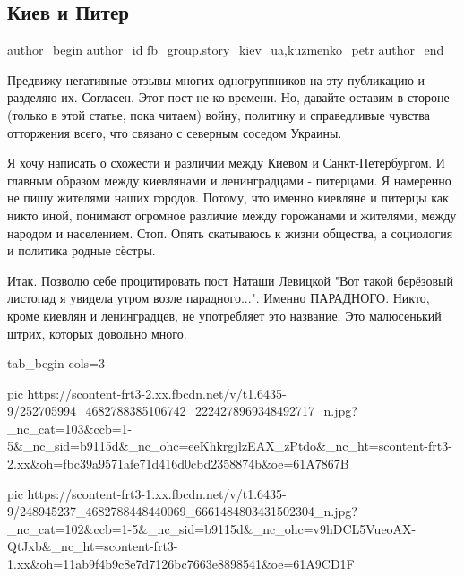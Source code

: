  
 
 
 
 
 
\subsection{Киев и Питер}
\label{sec:03_11_2021.fb.fb_group.story_kiev_ua.1.kiev_i_piter}
 
\ifcmt
 author_begin
   author_id fb_group.story_kiev_ua,kuzmenko_petr
 author_end
\fi

Предвижу негативные отзывы многих одногруппников на эту публикацию и разделяю
их. Согласен. Этот пост не ко времени. Но, давайте оставим в стороне (только в
этой статье, пока читаем) войну, политику и справедливые чувства отторжения
всего, что связано с северным соседом Украины. 

Я хочу написать о схожести и различии между Киевом и Санкт-Петербургом. И
главным образом между киевлянами и ленинградцами - питерцами. Я намеренно не
пишу жителями наших городов. Потому, что именно киевляне и питерцы как никто
иной, понимают огромное различие между горожанами и жителями, между народом и
населением. Стоп. Опять скатываюсь к жизни общества, а социология и политика
родные сёстры. 

Итак. Позволю себе
процитировать пост Наташи Левицкой "Вот такой берёзовый листопад я увидела
утром возле парадного...". Именно ПАРАДНОГО. Никто, кроме киевлян и
ленинградцев, не употребляет это название. Это малюсенький штрих, которых
довольно много. 

\ifcmt
  tab_begin cols=3

     pic https://scontent-frt3-2.xx.fbcdn.net/v/t1.6435-9/252705994_4682788385106742_2224278969348492717_n.jpg?_nc_cat=103&ccb=1-5&_nc_sid=b9115d&_nc_ohc=eeKhkrgjlzEAX_zPtdo&_nc_ht=scontent-frt3-2.xx&oh=fbc39a9571afe71d416d0cbd2358874b&oe=61A7867B

     pic https://scontent-frt3-1.xx.fbcdn.net/v/t1.6435-9/248945237_4682788448440069_6661484803431502304_n.jpg?_nc_cat=102&ccb=1-5&_nc_sid=b9115d&_nc_ohc=v9hDCL5VueoAX-QtJxb&_nc_ht=scontent-frt3-1.xx&oh=11ab9f4b9c8e7d7126bc7663e8898541&oe=61A9CD1F

